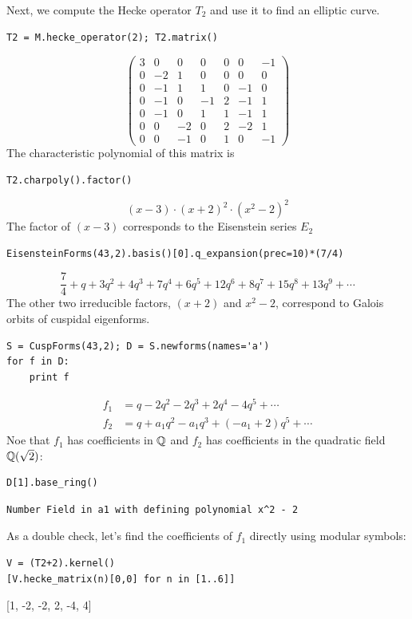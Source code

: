 \documentclass{book}
\begin{document}
Next, we compute the Hecke operator $T_2$ and use
it to find an elliptic curve.
\begin{lstlisting}
T2 = M.hecke_operator(2); T2.matrix()
\end{lstlisting}
$$
\left(\begin{array}{rrrrrrr}
3 & 0 & 0 & 0 & 0 & 0 & -1 \\
0 & -2 & 1 & 0 & 0 & 0 & 0 \\
0 & -1 & 1 & 1 & 0 & -1 & 0 \\
0 & -1 & 0 & -1 & 2 & -1 & 1 \\
0 & -1 & 0 & 1 & 1 & -1 & 1 \\
0 & 0 & -2 & 0 & 2 & -2 & 1 \\
0 & 0 & -1 & 0 & 1 & 0 & -1
\end{array}\right)
$$
The characteristic polynomial of this matrix is
\begin{lstlisting}
T2.charpoly().factor()
\end{lstlisting}
$$
(x - 3) \cdot (x + 2)^{2} \cdot (x^{2} - 2)^{2}
$$
The factor of $(x-3)$ corresponds to the
Eisenstein series $E_2$
\begin{lstlisting}
EisensteinForms(43,2).basis()[0].q_expansion(prec=10)*(7/4)
\end{lstlisting}
$$
\frac{7}{4} + q + 3q^{2} + 4q^{3} + 7q^{4} + 6q^{5} + 12q^{6} + 8q^{7} + 15q^{8} + 13q^{9} + \cdots
$$
The other two irreducible factors, $(x+2)$ and $x^2-2$,
correspond to Galois orbits of cuspidal eigenforms.
\begin{lstlisting}
S = CuspForms(43,2); D = S.newforms(names='a')
for f in D:
    print f
\end{lstlisting}
\begin{align*}
f_1 &= q - 2q^{2} - 2q^{3} + 2q^{4} - 4q^{5} + \cdots\\
f_2 &= q + a_{1}q^{2} - a_{1}q^{3} + \left(-a_{1} + 2\right)q^{5} + \cdots
\end{align*}
Noe that $f_1$ has coefficients in $\mathbb{Q}$ and
$f_2$ has coefficients in the quadratic
field $\mathbb{Q}(\sqrt{2})$:
\begin{lstlisting}
D[1].base_ring()
\end{lstlisting}
\begin{verbatim}
Number Field in a1 with defining polynomial x^2 - 2
\end{verbatim}

As a double check, let's find the coefficients of $f_1$
directly using modular symbols:
\begin{lstlisting}
V = (T2+2).kernel()
[V.hecke_matrix(n)[0,0] for n in [1..6]]
\end{lstlisting}
[1, -2, -2, 2, -4, 4]
\end{document}
